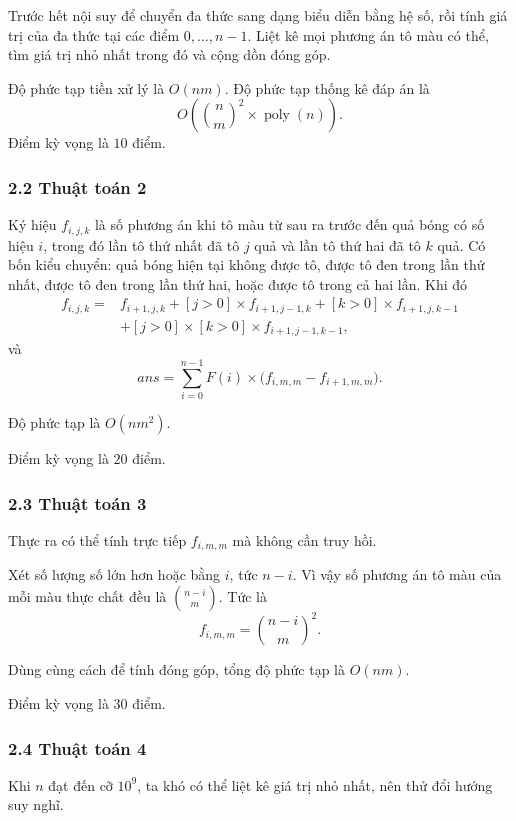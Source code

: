\documentclass[11pt]{article}
\begin{document}
Trước hết nội suy để chuyển đa thức sang dạng biểu diễn bằng hệ số, rồi tính
giá trị của đa thức tại các điểm \(0,\ldots,n-1\). Liệt kê mọi phương án tô
màu có thể, tìm giá trị nhỏ nhất trong đó và cộng dồn đóng góp.

Độ phức tạp tiền xử lý là \(O(nm)\). Độ phức tạp thống kê đáp án là
\[
  O\left(\binom{n}{m}^{2}\times \operatorname{poly}(n)\right).
\]
Điểm kỳ vọng là \(10\) điểm.

\subsubsection*{2.2 Thuật toán 2}

Ký hiệu \(f_{i,j,k}\) là số phương án khi tô màu từ sau ra trước đến quả bóng
có số hiệu \(i\), trong đó lần tô thứ nhất đã tô \(j\) quả và lần tô thứ hai đã
tô \(k\) quả. Có bốn kiểu chuyển: quả bóng hiện tại không được tô, được tô đen
trong lần thứ nhất, được tô đen trong lần thứ hai, hoặc được tô trong cả hai
lần. Khi đó
\[
\begin{aligned}
  f_{i,j,k}={}&f_{i+1,j,k}
  +[j>0]\times f_{i+1,j-1,k}
  +[k>0]\times f_{i+1,j,k-1}\\
  &+[j>0]\times [k>0]\times f_{i+1,j-1,k-1},
\end{aligned}
\]
và
\[
  ans=\sum_{i=0}^{n-1} F(i)\times \bigl(f_{i,m,m}-f_{i+1,m,m}\bigr).
\]

Độ phức tạp là \(O(nm^2)\).

Điểm kỳ vọng là \(20\) điểm.

\subsubsection*{2.3 Thuật toán 3}

Thực ra có thể tính trực tiếp \(f_{i,m,m}\) mà không cần truy hồi.

Xét số lượng số lớn hơn hoặc bằng \(i\), tức \(n-i\). Vì vậy số phương án tô
màu của mỗi màu thực chất đều là \(\binom{n-i}{m}\). Tức là
\[
  f_{i,m,m}=\binom{n-i}{m}^{2}.
\]

Dùng cùng cách để tính đóng góp, tổng độ phức tạp là \(O(nm)\).

Điểm kỳ vọng là \(30\) điểm.

\subsubsection*{2.4 Thuật toán 4}

Khi \(n\) đạt đến cỡ \(10^9\), ta khó có thể liệt kê giá trị nhỏ nhất, nên thử
đổi hướng suy nghĩ.
\end{document}
